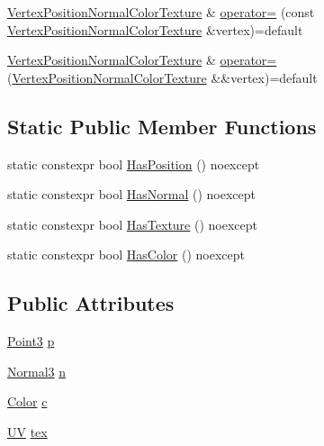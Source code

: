 \begin{DoxyCompactItemize}
\item 
\hyperlink{structmage_1_1_vertex_position_normal_color_texture}{Vertex\+Position\+Normal\+Color\+Texture} \& \hyperlink{structmage_1_1_vertex_position_normal_color_texture_a2053f5942c404f3d42f6e5a129c3e694}{operator=} (const \hyperlink{structmage_1_1_vertex_position_normal_color_texture}{Vertex\+Position\+Normal\+Color\+Texture} \&vertex)=default
\item 
\hyperlink{structmage_1_1_vertex_position_normal_color_texture}{Vertex\+Position\+Normal\+Color\+Texture} \& \hyperlink{structmage_1_1_vertex_position_normal_color_texture_a98da26b1f52c0b98b44fd3a99080615a}{operator=} (\hyperlink{structmage_1_1_vertex_position_normal_color_texture}{Vertex\+Position\+Normal\+Color\+Texture} \&\&vertex)=default
\end{DoxyCompactItemize}
\subsection*{Static Public Member Functions}
\begin{DoxyCompactItemize}
\item 
static constexpr bool \hyperlink{structmage_1_1_vertex_position_normal_color_texture_a493fdcc26dfbee8025da34f2d2600b1f}{Has\+Position} () noexcept
\item 
static constexpr bool \hyperlink{structmage_1_1_vertex_position_normal_color_texture_af1b565b25fd4beb2cff66931cc32de86}{Has\+Normal} () noexcept
\item 
static constexpr bool \hyperlink{structmage_1_1_vertex_position_normal_color_texture_a27f5a115642f443419683417360fd58e}{Has\+Texture} () noexcept
\item 
static constexpr bool \hyperlink{structmage_1_1_vertex_position_normal_color_texture_aee56f3577ac93b0f57084ab76ec45abd}{Has\+Color} () noexcept
\end{DoxyCompactItemize}
\subsection*{Public Attributes}
\begin{DoxyCompactItemize}
\item 
\hyperlink{structmage_1_1_point3}{Point3} \hyperlink{structmage_1_1_vertex_position_normal_color_texture_ac7808865ca6672b7d0f4f8457077bd16}{p}
\item 
\hyperlink{structmage_1_1_normal3}{Normal3} \hyperlink{structmage_1_1_vertex_position_normal_color_texture_a7304bf677ad4f16aea974e63f4324eba}{n}
\item 
\hyperlink{structmage_1_1_color}{Color} \hyperlink{structmage_1_1_vertex_position_normal_color_texture_a6b28cefeab374c3f38c44b49eea2ec78}{c}
\item 
\hyperlink{structmage_1_1_u_v}{UV} \hyperlink{structmage_1_1_vertex_position_normal_color_texture_a3477ce06d0778a1119cbf2e961d7c3ed}{tex}
\end{DoxyCompactItemize}
